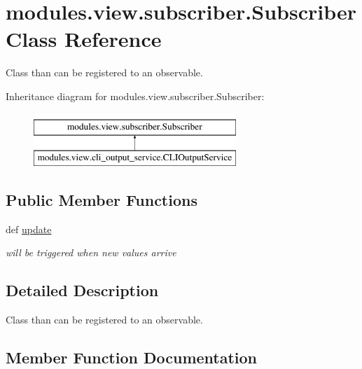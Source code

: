 \hypertarget{classmodules_1_1view_1_1subscriber_1_1_subscriber}{}\section{modules.\+view.\+subscriber.\+Subscriber Class Reference}
\label{classmodules_1_1view_1_1subscriber_1_1_subscriber}


Class than can be registered to an observable.  


Inheritance diagram for modules.\+view.\+subscriber.\+Subscriber\+:\begin{figure}[H]
\begin{center}
\leavevmode
\includegraphics[height=2.000000cm]{classmodules_1_1view_1_1subscriber_1_1_subscriber}
\end{center}
\end{figure}
\subsection*{Public Member Functions}
\begin{DoxyCompactItemize}
\item 
def \mbox{\hyperlink{classmodules_1_1view_1_1subscriber_1_1_subscriber_a270f8cd70bacb880fa467ee870c2d959}{update}}
\begin{DoxyCompactList}\small\item\em will be triggered when new values arrive \end{DoxyCompactList}\end{DoxyCompactItemize}


\subsection{Detailed Description}
Class than can be registered to an observable. 

\subsection{Member Function Documentation}
\mbox{\label{classmodules_1_1view_1_1subscriber_1_1_subscriber_a270f8cd70bacb880fa467ee870c2d959}} 
